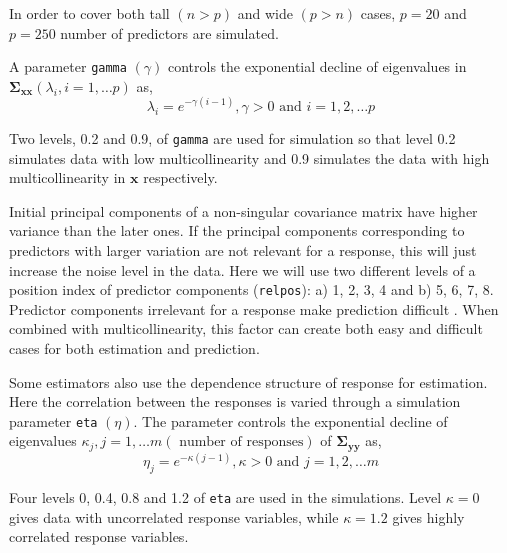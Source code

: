 \documentclass[12pt,3p,authoryear]{elsarticle}
\providecommand{\tightlist}{%
  \setlength{\itemsep}{0pt}\setlength{\parskip}{0pt}}
\begin{document}
\begin{description}
\tightlist
\item[\textbf{Number of predictors: (\texttt{p})}]
In order to cover both tall \((n>p)\) and wide \((p>n)\) cases, \(p= 20\) and \(p= 250\) number of predictors are simulated.
\item[\textbf{Multicollinearity in predictor variables: (\texttt{gamma})}]
A parameter \texttt{gamma} \((\gamma)\) controls the exponential decline of eigenvalues in \(\boldsymbol{\Sigma_{xx}} (\lambda_i, i = 1, \ldots p)\) as,
\begin{equation}
  \lambda_i = e^{-\gamma(i-1)}, \gamma > 0 \text{ and } i = 1, 2, \ldots p
  \label{eq:gamma}
  \end{equation}

Two levels, 0.2 and 0.9, of \texttt{gamma} are used for simulation so that level 0.2 simulates data with low multicollinearity and 0.9 simulates the data with high multicollinearity in \(\mathbf{x}\) respectively.
\item[\textbf{Position of relevant components: (\texttt{relpos})}]
Initial principal components of a non-singular covariance matrix have higher variance than the later ones. If the principal components corresponding to predictors with larger variation are not relevant for a response, this will just increase the noise level in the data. Here we will use two different levels of a position index of predictor components (\texttt{relpos}): a) 1, 2, 3, 4 and b) 5, 6, 7, 8. Predictor components irrelevant for a response make prediction difficult \citep{Helland1994b}. When combined with multicollinearity, this factor can create both easy and difficult cases for both estimation and prediction.
\item[\textbf{Correlation in response variables: (\texttt{eta})}]
Some estimators also use the dependence structure of response for estimation. Here the correlation between the responses is varied through a simulation parameter \texttt{eta} \((\eta)\). The parameter controls the exponential decline of eigenvalues \(\kappa_j, j = 1, \ldots m (\text{ number of responses})\) of \(\boldsymbol{\Sigma_{yy}}\) as,
\begin{equation}
\eta_j = e^{-\kappa(j-1)}, \kappa > 0 \text{ and } j = 1, 2, \ldots m
\label{eq:eta}
\end{equation}

Four levels 0, 0.4, 0.8 and 1.2 of \texttt{eta} are used in the simulations. Level \(\kappa=0\) gives data with uncorrelated response variables, while \(\kappa=1.2\) gives highly correlated response variables.
\end{description}
\end{document}
